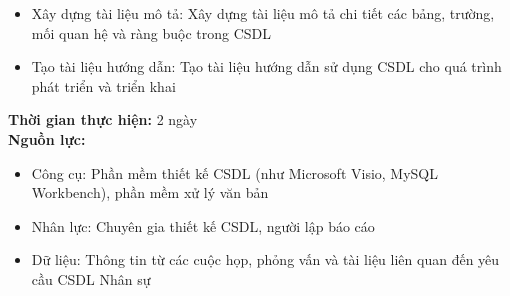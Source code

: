 {\begin{minipage}{\textwidth}
\begin{itemize}
        \item Xây dựng tài liệu mô tả: Xây dựng tài liệu mô tả chi tiết các bảng, trường, mối quan hệ và ràng buộc trong CSDL
        \item Tạo tài liệu hướng dẫn: Tạo tài liệu hướng dẫn sử dụng CSDL cho quá trình phát triển và triển khai
    \end{itemize}
    \noindent \textbf{Thời gian thực hiện:} 2 ngày \\
    \noindent \textbf{Nguồn lực:}
    \begin{itemize}
        \item Công cụ: Phần mềm thiết kế CSDL (như Microsoft Visio, MySQL Workbench), phần mềm xử lý văn bản
        \item Nhân lực: Chuyên gia thiết kế CSDL, người lập báo cáo
        \item Dữ liệu: Thông tin từ các cuộc họp, phỏng vấn và tài liệu liên quan đến yêu cầu CSDL Nhân sự
    \end{itemize}
    \end{minipage}
}
\newpage
{}      
